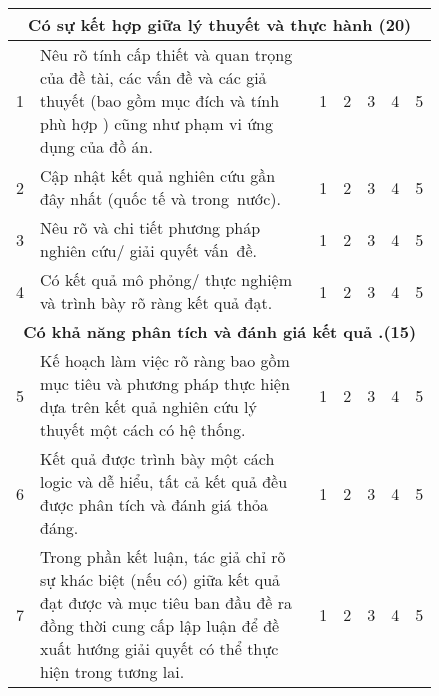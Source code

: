     \begin{longtable}{| m{0.035\linewidth} | m{0.7\linewidth} | m{0.02\linewidth} | m{0.02\linewidth}| m{0.02\linewidth}|  m{0.02\linewidth} | m{0.02\linewidth} |}
    \hline
    \multicolumn{7}{|c|}{\textbf{Có sự kết hợp giữa lý thuyết và thực hành (20)}} \\ \hline
    1 & Nêu rõ tính cấp thiết và quan trọng của đề tài, các vấn đề và các giả thuyết (bao gồm mục đích và tính phù hợp ) cũng như phạm vi ứng dụng của đồ án. & 1 & 2 & 3 & 4 & 5 \\ \hline
    2 & Cập nhật kết quả nghiên cứu gần đây nhất (quốc tế và trong~nước). & 1 & 2 & 3 & 4 & 5 \\ \hline   
	3 & Nêu rõ và chi tiết phương pháp nghiên cứu/ giải quyết vấn~đề.  & 1 & 2 & 3 & 4 & 5 \\ \hline 
	4 & Có kết quả mô phỏng/ thực nghiệm và trình bày rõ ràng kết quả đạt.  & 1 & 2 & 3 & 4 & 5 \\ \hline 
	\multicolumn{7}{|c|}{\textbf{Có khả năng phân tích và đánh giá kết quả .(15)}} \\ \hline
	5 & Kế hoạch làm việc rõ ràng bao gồm mục tiêu và phương pháp thực hiện dựa trên kết quả nghiên cứu lý thuyết một cách có hệ thống. & 1 & 2 & 3 & 4 & 5 \\ \hline
    6 & Kết quả được trình bày một cách logic và dễ hiểu, tất cả kết quả đều được phân tích và đánh giá thỏa đáng. & 1 & 2 & 3 & 4 & 5 \\ \hline   
	7 & Trong phần kết luận, tác giả chỉ rõ sự khác biệt (nếu có) giữa kết quả đạt được và mục tiêu ban đầu đề ra đồng thời cung cấp lập luận để đề xuất hướng giải quyết có thể thực hiện trong tương lai.  & 1 & 2 & 3 & 4 & 5 \\ \hline 
	

\end{longtable}
